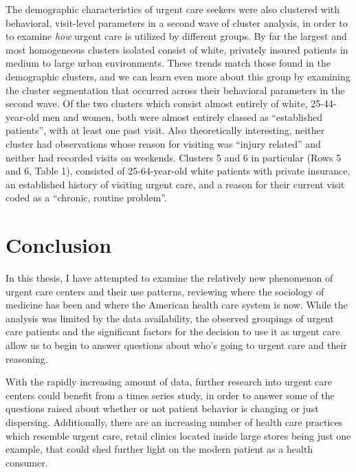 \documentclass[12pt,twoside]{reedthesis}
\begin{document}
  The demographic characteristics of urgent care seekers were also
  clustered with behavioral, visit-level parameters in a second wave of
  cluster analysis, in order to to examine \emph{how} urgent care is
  utilized by different groups. By far the largest and most homogeneous
  clusters isolated consist of white, privately insured patients in medium
  to large urban environments. These trends match those found in the
  demographic clusters, and we can learn even more about this group by
  examining the cluster segmentation that occurred across their behavioral
  parameters in the second wave. Of the two clusters which consist almost
  entirely of white, 25-44-year-old men and women, both were almost
  entirely classed as ``established patients'', with at least one past
  visit. Also theoretically interesting, neither cluster had observations
  whose reason for visiting was ``injury related'' and neither had
  recorded visits on weekends. Clusters 5 and 6 in particular (Rows 5 and
  6, Table 1), consisted of 25-64-year-old white patients with private
  insurance, an established history of visiting urgent care, and a reason
  for their current visit coded as a ``chronic, routine problem''.
  
  \chapter{Conclusion}\label{conclusion}
  
  \setcounter{chapter}{6} \setcounter{section}{0} \doublespacing
  
  In this thesis, I have attempted to examine the relatively new
  phenomenon of urgent care centers and their use patterns, reviewing
  where the sociology of medicine has been and where the American health
  care system is now. While the analysis was limited by the data
  availability, the observed groupings of urgent care patients and the
  significant factors for the decision to use it as urgent care allow us
  to begin to answer questions about who's going to urgent care and their
  reasoning.
  
  With the rapidly increasing amount of data, further research into urgent
  care centers could benefit from a times series study, in order to answer
  some of the questions raised about whether or not patient behavior is
  changing or just dispersing. Additionally, there are an increasing
  number of health care practices which resemble urgent care, retail
  clinics located inside large stores being just one example, that could
  shed further light on the modern patient as a health consumer.
  
\end{document}
